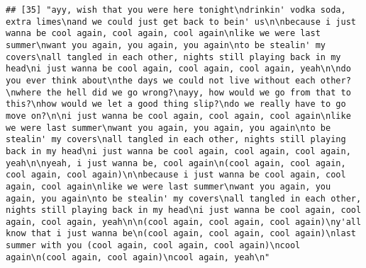 \documentclass[]{article}
\begin{document}
\begin{verbatim}
## [35] "ayy, wish that you were here tonight\ndrinkin' vodka soda, extra limes\nand we could just get back to bein' us\n\nbecause i just wanna be cool again, cool again, cool again\nlike we were last summer\nwant you again, you again, you again\nto be stealin' my covers\nall tangled in each other, nights still playing back in my head\ni just wanna be cool again, cool again, cool again, yeah\n\ndo you ever think about\nthe days we could not live without each other?\nwhere the hell did we go wrong?\nayy, how would we go from that to this?\nhow would we let a good thing slip?\ndo we really have to go move on?\n\ni just wanna be cool again, cool again, cool again\nlike we were last summer\nwant you again, you again, you again\nto be stealin' my covers\nall tangled in each other, nights still playing back in my head\ni just wanna be cool again, cool again, cool again, yeah\n\nyeah, i just wanna be, cool again\n(cool again, cool again, cool again, cool again)\n\nbecause i just wanna be cool again, cool again, cool again\nlike we were last summer\nwant you again, you again, you again\nto be stealin' my covers\nall tangled in each other, nights still playing back in my head\ni just wanna be cool again, cool again, cool again, yeah\n\n(cool again, cool again, cool again)\ny'all know that i just wanna be\n(cool again, cool again, cool again)\nlast summer with you (cool again, cool again, cool again)\ncool again\n(cool again, cool again)\ncool again, yeah\n"                                                                                                                                                                                                                                                                                                                                                                                                                                                                                                                                                                                                                                                                                                                                                                                                                                                                                                                                                                                                                                                                                                                                                                                                                                                                                                                                                                                                                                                           

\end{verbatim}
\end{document}
